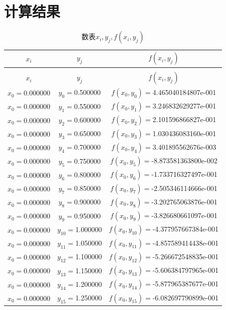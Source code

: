 \chapter{计算结果}

\begin{longtable}{ccc}

\toprule
 $x_i$ & $y_j$ & $f(x_i,y_j)$\\
\midrule
\endhead

\caption{数表${x_i},{y_j},f({x_i},{y_j})$}\\
\toprule
 $x_i$ & $y_j$ & $f(x_i,y_j)$\\
 \midrule
\endfirsthead
\bottomrule
\endfoot
\bottomrule
\endlastfoot
$x_{0}=$0.000000 & $y_{0}=$0.500000 & $f(x_{0},y_{0})=$4.465040184807e-001 \\
$x_{0}=$0.000000 & $y_{1}=$0.550000 & $f(x_{0},y_{1})=$3.246832629277e-001 \\
$x_{0}=$0.000000 & $y_{2}=$0.600000 & $f(x_{0},y_{2})=$2.101596866827e-001 \\
$x_{0}=$0.000000 & $y_{3}=$0.650000 & $f(x_{0},y_{3})=$1.030436083160e-001 \\
$x_{0}=$0.000000 & $y_{4}=$0.700000 & $f(x_{0},y_{4})=$3.401895562676e-003 \\
$x_{0}=$0.000000 & $y_{5}=$0.750000 & $f(x_{0},y_{5})=$-8.873581363800e-002 \\
$x_{0}=$0.000000 & $y_{6}=$0.800000 & $f(x_{0},y_{6})=$-1.733716327497e-001 \\
$x_{0}=$0.000000 & $y_{7}=$0.850000 & $f(x_{0},y_{7})=$-2.505346114666e-001 \\
$x_{0}=$0.000000 & $y_{8}=$0.900000 & $f(x_{0},y_{8})=$-3.202765063876e-001 \\
$x_{0}=$0.000000 & $y_{9}=$0.950000 & $f(x_{0},y_{9})=$-3.826680661097e-001 \\
$x_{0}=$0.000000 & $y_{10}=$1.000000 & $f(x_{0},y_{10})=$-4.377957667384e-001 \\
$x_{0}=$0.000000 & $y_{11}=$1.050000 & $f(x_{0},y_{11})=$-4.857589414438e-001 \\
$x_{0}=$0.000000 & $y_{12}=$1.100000 & $f(x_{0},y_{12})=$-5.266672548835e-001 \\
$x_{0}=$0.000000 & $y_{13}=$1.150000 & $f(x_{0},y_{13})=$-5.606384797965e-001 \\
$x_{0}=$0.000000 & $y_{14}=$1.200000 & $f(x_{0},y_{14})=$-5.877965387677e-001 \\
$x_{0}=$0.000000 & $y_{15}=$1.250000 & $f(x_{0},y_{15})=$-6.082697790899e-001 \\

\end{longtable}
